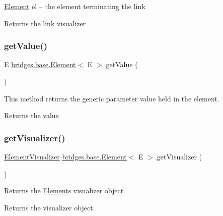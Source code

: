 \mbox{\hyperlink{classbridges_1_1base_1_1_element}{Element}} el -- the element terminating the link

\begin{DoxyReturn}{Returns}
the link visualizer 
\end{DoxyReturn}
\mbox{\label{classbridges_1_1base_1_1_element_a44ddc61db34b6cf0bab7dfba667d54af}} 
\subsubsection{\texorpdfstring{get\+Value()}{getValue()}}
{\footnotesize\ttfamily E \mbox{\hyperlink{classbridges_1_1base_1_1_element}{bridges.\+base.\+Element}}$<$ E $>$.get\+Value (\begin{DoxyParamCaption}{ }\end{DoxyParamCaption})}

This method returns the generic parameter value held in the element.

\begin{DoxyReturn}{Returns}
the value 
\end{DoxyReturn}
\mbox{\label{classbridges_1_1base_1_1_element_a42c84d41dfb7bd05a586e303cb33de72}} 
\subsubsection{\texorpdfstring{get\+Visualizer()}{getVisualizer()}}
{\footnotesize\ttfamily \mbox{\hyperlink{classbridges_1_1base_1_1_element_visualizer}{Element\+Visualizer}} \mbox{\hyperlink{classbridges_1_1base_1_1_element}{bridges.\+base.\+Element}}$<$ E $>$.get\+Visualizer (\begin{DoxyParamCaption}{ }\end{DoxyParamCaption})}

Returns the \mbox{\hyperlink{classbridges_1_1base_1_1_element}{Element}}\textquotesingle{}s visualizer object

\begin{DoxyReturn}{Returns}
the visualizer object 
\end{DoxyReturn}
\mbox{\label{classbridges_1_1base_1_1_element_a144cd54e043a801fab326769a5da01e2}} 
